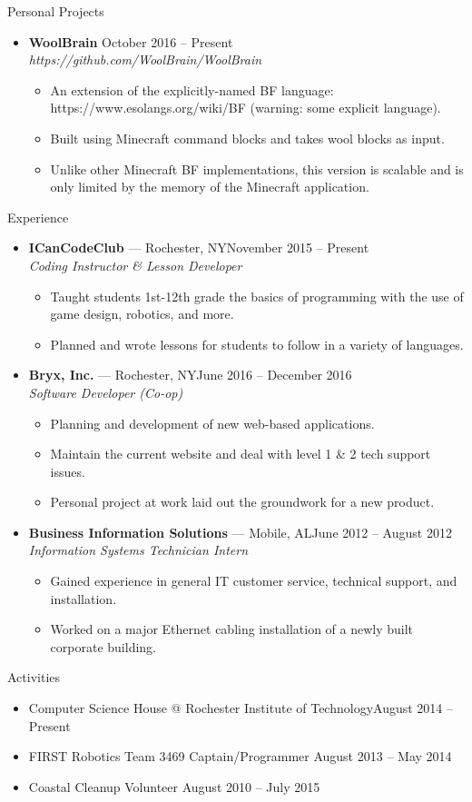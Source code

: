 \documentclass[10pt,oneside]{article}
\newenvironment{ressection}[1]{
	\vspace{3pt}
	{\fontfamily{bch}\selectfont\Large#1}
	\begin{itemize}
	\vspace{2pt}
}{
	\end{itemize}
}
\newcommand{\resitem}[1]{
	\vspace{-2pt}
	\item \begin{flushleft} #1 \end{flushleft}
}
\newcommand{\ressubitem}[1]{
	\vspace{-1pt}
	\item \begin{flushleft} #1 \end{flushleft}
}
\newcommand{\resbigitem}[3]{
	\vspace{-3pt}
	\item
	\textbf{#1} --- #2 \\
	\textit{#3}
}
\newcommand{\resaltitem}[3]{
	\vspace{-3pt}
	\item
	\textbf{#1} \hfill #2 \\
	\textit{#3}
}
\newenvironment{ressubsec}[3]{
	\resbigitem{#1}{#2}{#3}
	\vspace{-1pt}
	\begin{itemize}
}{
	\end{itemize}
}
\newenvironment{resaltsec}[3]{
	\resaltitem{#1}{#2}{#3}
	\vspace{-1pt}
	\begin{itemize}
}{
	\end{itemize}
}
\begin{document}
\begin{ressection}{Personal Projects}

	\begin{resaltsec}{WoolBrain}{October 2016 -- Present}{https://github.com/WoolBrain/WoolBrain}
		\ressubitem{An extension of the explicitly-named BF language: https://www.esolangs.org/wiki/BF (warning: some explicit language).}
		\ressubitem{Built using Minecraft command blocks and takes wool blocks as input.}
		\ressubitem{Unlike other Minecraft BF implementations, this version is scalable and is only limited by the memory of the Minecraft application.}
	\end{resaltsec}
\end{ressection}


\begin{ressection}{Experience}

	\begin{ressubsec}{ICanCodeClub}{Rochester, NY\hfill November 2015 -- Present}{Coding Instructor \& Lesson Developer}
		\ressubitem{Taught students 1st-12th grade the basics of programming with the use of game design, robotics, and more.}
		\ressubitem{Planned and wrote lessons for students to follow in a variety of languages.}
	\end{ressubsec}
	\begin{ressubsec}{Bryx, Inc.}{Rochester, NY\hfill June 2016 -- December 2016}{Software Developer (Co-op)}
		\ressubitem{Planning and development of new web-based applications.}
		\ressubitem{Maintain the current website and deal with level 1 \& 2 tech support issues.}
		\ressubitem{Personal project at work laid out the groundwork for a new product.}
	\end{ressubsec}
	\begin{ressubsec}{Business Information Solutions}{Mobile, AL\hfill June 2012 -- August 2012}{Information Systems Technician Intern}
		\ressubitem{Gained experience in general IT customer service, technical support, and installation.}
		\ressubitem{Worked on a major Ethernet cabling installation of a newly built corporate building.}
	\end{ressubsec}

\end{ressection}


\begin{ressection}{Activities}

	\resitem{Computer Science House @ Rochester Institute of Technology\hfill August 2014 -- Present}
	\resitem{FIRST Robotics Team 3469 Captain/Programmer \hfill August 2013 -- May 2014}
	\resitem{Coastal Cleanup Volunteer \hfill August 2010 -- July 2015}

\end{ressection}
\end{document}
